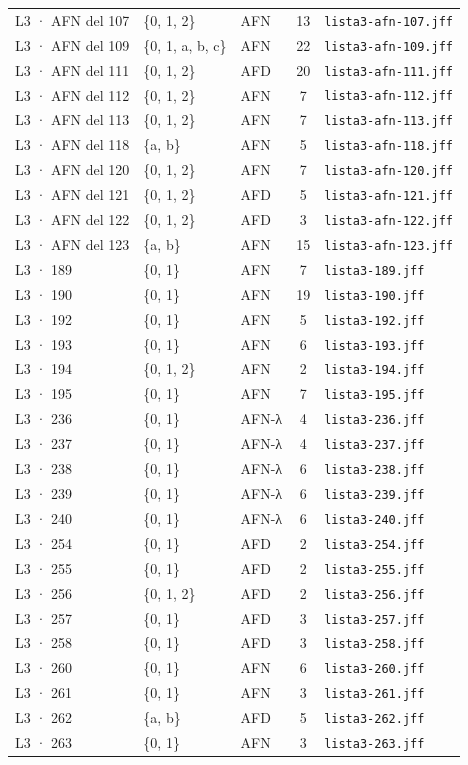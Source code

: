 \begin{longtable}[]{@{}lllcl@{}}
L3 · AFN del 107 & \{0, 1, 2\} & AFN & 13 & \texttt{lista3-afn-107.jff} \\
L3 · AFN del 109 & \{0, 1, a, b, c\} & AFN & 22 & \texttt{lista3-afn-109.jff} \\
L3 · AFN del 111 & \{0, 1, 2\} & AFD & 20 & \texttt{lista3-afn-111.jff} \\
L3 · AFN del 112 & \{0, 1, 2\} & AFN & 7 & \texttt{lista3-afn-112.jff} \\
L3 · AFN del 113 & \{0, 1, 2\} & AFN & 7 & \texttt{lista3-afn-113.jff} \\
L3 · AFN del 118 & \{a, b\} & AFN & 5 & \texttt{lista3-afn-118.jff} \\
L3 · AFN del 120 & \{0, 1, 2\} & AFN & 7 & \texttt{lista3-afn-120.jff} \\
L3 · AFN del 121 & \{0, 1, 2\} & AFD & 5 & \texttt{lista3-afn-121.jff} \\
L3 · AFN del 122 & \{0, 1, 2\} & AFD & 3 & \texttt{lista3-afn-122.jff} \\
L3 · AFN del 123 & \{a, b\} & AFN & 15 & \texttt{lista3-afn-123.jff} \\
L3 · 189 & \{0, 1\} & AFN & 7 & \texttt{lista3-189.jff} \\
L3 · 190 & \{0, 1\} & AFN & 19 & \texttt{lista3-190.jff} \\
L3 · 192 & \{0, 1\} & AFN & 5 & \texttt{lista3-192.jff} \\
L3 · 193 & \{0, 1\} & AFN & 6 & \texttt{lista3-193.jff} \\
L3 · 194 & \{0, 1, 2\} & AFN & 2 & \texttt{lista3-194.jff} \\
L3 · 195 & \{0, 1\} & AFN & 7 & \texttt{lista3-195.jff} \\
L3 · 236 & \{0, 1\} & AFN-λ & 4 & \texttt{lista3-236.jff} \\
L3 · 237 & \{0, 1\} & AFN-λ & 4 & \texttt{lista3-237.jff} \\
L3 · 238 & \{0, 1\} & AFN-λ & 6 & \texttt{lista3-238.jff} \\
L3 · 239 & \{0, 1\} & AFN-λ & 6 & \texttt{lista3-239.jff} \\
L3 · 240 & \{0, 1\} & AFN-λ & 6 & \texttt{lista3-240.jff} \\
L3 · 254 & \{0, 1\} & AFD & 2 & \texttt{lista3-254.jff} \\
L3 · 255 & \{0, 1\} & AFD & 2 & \texttt{lista3-255.jff} \\
L3 · 256 & \{0, 1, 2\} & AFD & 2 & \texttt{lista3-256.jff} \\
L3 · 257 & \{0, 1\} & AFD & 3 & \texttt{lista3-257.jff} \\
L3 · 258 & \{0, 1\} & AFD & 3 & \texttt{lista3-258.jff} \\
L3 · 260 & \{0, 1\} & AFN & 6 & \texttt{lista3-260.jff} \\
L3 · 261 & \{0, 1\} & AFN & 3 & \texttt{lista3-261.jff} \\
L3 · 262 & \{a, b\} & AFD & 5 & \texttt{lista3-262.jff} \\
L3 · 263 & \{0, 1\} & AFN & 3 & \texttt{lista3-263.jff} \\
\end{longtable}
